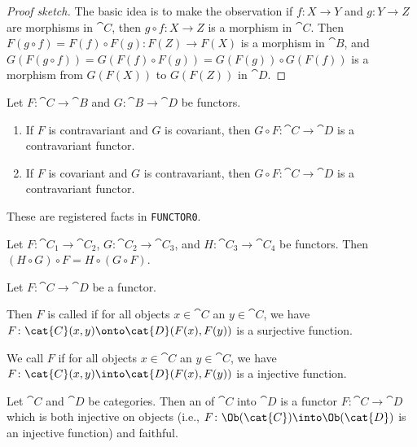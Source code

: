 \begin{proof}[Proof sketch]
The basic idea is to make the observation
if $f\colon X\to Y$ and $g\colon Y\to Z$ are morphisms in $\cat{C}$,
then $g\circ f\colon X\to Z$ is a morphism in $\cat{C}$. Then
$F(g\circ f)=F(f)\circ F(g)\colon F(Z)\to F(X)$ is a morphism in $\cat{B}$,
and $G(F(g\circ f))=G(F(f)\circ F(g))=G(F(g))\circ G(F(f))$ is a
morphism from $G(F(X))$ to $G(F(Z))$ in $\cat{D}$.
\end{proof}

\begin{theorem}
Let $F\colon\cat{C}\to\cat{B}$ and $G\colon\cat{B}\to\cat{D}$ be
functors.
\begin{enumerate}
\item{} If $F$ is contravariant and $G$ is covariant, then $G\circ F\colon\cat{C}\to\cat{D}$ is a contravariant functor.
\item{} If $F$ is covariant and $G$ is contravariant, then $G\circ F\colon\cat{C}\to\cat{D}$ is a contravariant functor.
\end{enumerate}
\end{theorem}

These are registered facts in \texttt{FUNCTOR0}.

\begin{theorem}
Let $F\colon\cat{C}_{1}\to\cat{C}_{2}$, $G\colon\cat{C}_{2}\to\cat{C}_{3}$,
and $H\colon\cat{C}_{3}\to\cat{C}_{4}$ be functors.
Then $(H\circ G)\circ F=H\circ(G\circ F)$.
\end{theorem}

\begin{definition}
Let $F\colon\cat{C}\to\cat{D}$ be a functor.

Then $F$ is called  if for
all objects $x\in\cat{C}$ an $y\in\cat{C}$, we have $F\colon\cat{C}(x,y)\onto\cat{D}(F(x),F(y))$
is a surjective function.

We call $F$  if for
all objects $x\in\cat{C}$ an $y\in\cat{C}$, we have $F\colon\cat{C}(x,y)\into\cat{D}(F(x),F(y))$
is a injective function.
\end{definition}

\begin{definition}
Let $\cat{C}$ and $\cat{D}$ be categories.
Then an  of $\cat{C}$ into $\cat{D}$ is a functor
$F\colon\cat{C}\to\cat{D}$ which is both injective on objects (i.e.,
$F\colon\Ob(\cat{C})\into\Ob(\cat{D})$ is an injective function) and faithful.
\end{definition}

